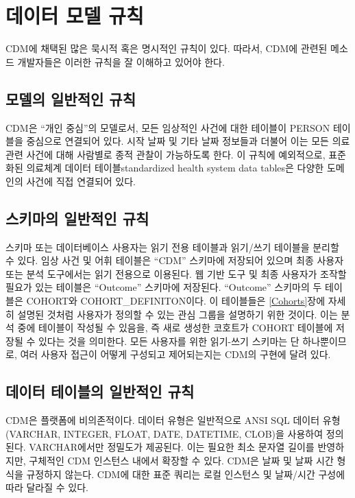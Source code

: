 \documentclass[11pt]{book}
\theoremstyle{definition}
\theoremstyle{definition}
\theoremstyle{definition}
\theoremstyle{remark}
\begin{document}
\section{데이터 모델 규칙}\label{--}

CDM에 채택된 많은 묵시적 혹은 명시적인 규칙이 있다. 따라서, CDM에 관련된
메소드 개발자들은 이러한 규칙을 잘 이해하고 있어야 한다.

\subsection{모델의 일반적인 규칙}\label{model-Conv}

CDM은 ``개인 중심''의 모델로서, 모든 임상적인 사건에 대한 테이블이
PERSON 테이블을 중심으로 연결되어 있다. 시작 날짜 및 기타 날짜 정보들과
더불어 이는 모든 의료 관련 사건에 대해 사람별로 종적 관찰이 가능하도록
한다. 이 규칙에 예외적으로, 표준화된 의료체계 데이터 테이블standardized
health system data tables은 다양한 도메인의 사건에 직접 연결되어 있다.

\subsection{스키마의 일반적인 규칙}\label{--}

스키마 또는 데이터베이스 사용자는 읽기 전용 테이블과 읽기/쓰기 테이블을
분리할 수 있다. 임상 사건 및 어휘 테이블은 ``CDM'' 스키마에 저장되어
있으며 최종 사용자 또는 분석 도구에서는 읽기 전용으로 이용된다. 웹 기반
도구 및 최종 사용자가 조작할 필요가 있는 테이블은 ``Outcome'' 스키마에
저장된다. ``Outcome'' 스키마의 두 테이블은 COHORT와
COHORT\_DEFINITON이다. 이 테이블들은 \ref{Cohorts}장에 자세히 설명된
것처럼 사용자가 정의할 수 있는 관심 그룹을 설명하기 위한 것이다. 이는
분석 중에 테이블이 작성될 수 있음을, 즉 새로 생성한 코호트가 COHORT
테이블에 저장될 수 있다는 것을 의미한다. 모든 사용자를 위한 읽기-쓰기
스키마는 단 하나뿐이므로, 여러 사용자 접근이 어떻게 구성되고
제어되는지는 CDM의 구현에 달려 있다.

\subsection{데이터 테이블의 일반적인 규칙}\label{---}

CDM은 플랫폼에 비의존적이다. 데이터 유형은 일반적으로 ANSI SQL 데이터
유형 (VARCHAR, INTEGER, FLOAT, DATE, DATETIME, CLOB)을 사용하여
정의된다. VARCHAR에서만 정밀도가 제공된다. 이는 필요한 최소 문자열
길이를 반영하지만, 구체적인 CDM 인스턴스 내에서 확장할 수 있다. CDM은
날짜 및 날짜 시간 형식을 규정하지 않는다. CDM에 대한 표준 쿼리는 로컬
인스턴스 및 날짜/시간 구성에 따라 달라질 수 있다.
\end{document}
